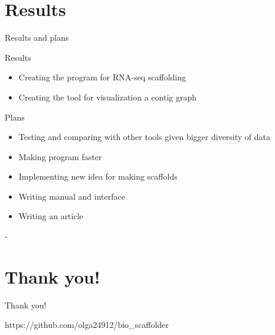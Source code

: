 \documentclass{beamer}
\begin{document}
\section{Results}
\begin{frame}[t]{Results and plans}
	\begin{block}{Results}
		\begin{itemize}
			\item Creating the program for RNA-seq scaffolding 
			\item Creating the tool for visualization a contig graph
		\end{itemize}
	\end{block}
	\begin{block}{Plans}
		\begin{itemize}
			\item Testing and comparing with other tools given bigger diversity of data
			\item Making program faster 
			\item Implementing new idea for making scaffolds 
			\item Writing manual and interface
			\item Writing an article
			\end{itemize}-
	\end{block}
\end{frame}


\section{Thank you!}
\begin{frame}{Thank you!}
    \begin{center}
        https://github.com/olga24912/bio\_scaffolder
    \end{center}
\end{frame}
\end{document}
